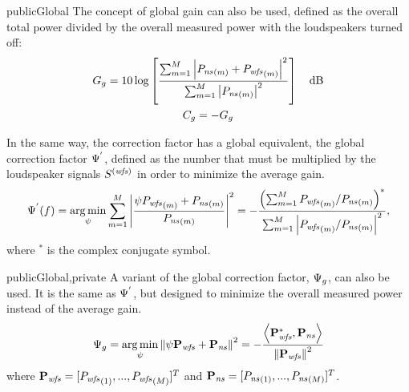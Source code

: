 \begin{shownto}{publicGlobal}
	The concept of global gain can also be used, defined as the overall total power divided by the overall measured power with the loudspeakers turned off:
	\begin{gather}
		\globalGain = 10 \log \left[\frac{\sum_{m=1}^\numMeasPoints \abs{\Field[ns][frequency][scalar][m] + \Field[wfs][frequency][scalar][m]}^2}{\sum_{m=1}^\numMeasPoints \abs{\Field[ns][frequency][scalar][m]}^2}\right] \quad \si{dB}
		\\
		\globalCancellation = -\globalGain
	\end{gather}
\end{shownto}

In the same way, the correction factor has a global equivalent, the global correction factor $\Psi^{'}$, defined as the number that must be multiplied by the loudspeaker signals $\signal[wfs][frequency]$ in order to minimize the average gain.
\begin{equation}
\globalCorrectionFactorAverGain(f) = \argmin_{\psi} \sum_{m=1}^\numMeasPoints \abs{\frac{\psi \Field[wfs][frequency][scalar][m] + \Field[ns][frequency][scalar][m]}{\Field[ns][frequency][scalar][m]}}^2 =
-\frac{\left(\sum_{m=1}^\numMeasPoints \Field[wfs][frequency][scalar][m]/\Field[ns][frequency][scalar][m]\right)^*}{\sum_{m=1}^\numMeasPoints \abs{\Field[wfs][frequency][scalar][m]/\Field[ns][frequency][scalar][m]}^2},
\end{equation}
where $^*$ is the complex conjugate symbol.

\begin{shownto}{publicGlobal,private}	
A variant of the global correction factor, $\Psi_g$, can also be used. It is the same as $\Psi^{'}$, but designed to minimize the overall measured power instead of the average gain.
	\begin{equation}
	\globalCorrectionFactor = \argmin_{\psi} \norm{\psi \Field[wfs][frequency][vector] + \Field[ns][frequency][vector]}^2 = -\frac{\scalarProd{\Field[wfs][frequency][vector]^*}{\Field[ns][frequency][vector]}}{\norm{\Field[wfs][frequency][vector]}^2}
	\end{equation}
	where $\Field[wfs][frequency][vector] = [\Field[wfs][frequency][scalar][1],...,\Field[wfs][frequency][scalar][\numMeasPoints]]^T$ and $\Field[ns][frequency][vector] = [\Field[ns][frequency][scalar][1],...,\Field[ns][frequency][scalar][\numMeasPoints]]^T$.
\end{shownto}

